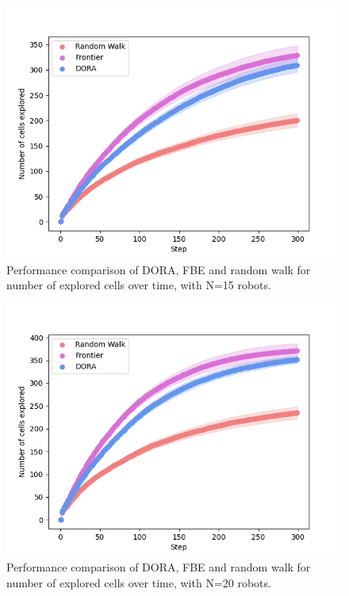 \begin{figure}[h]
	\centering
    \includegraphics[width=0.99\columnwidth]{images/explored_15.png}
    \caption{Performance comparison of DORA, FBE and random walk for number of explored cells over time, with N=15 robots.}
    \label{results:explored15}
\end{figure}

\begin{figure}[h]
	\centering
    \includegraphics[width=0.99\columnwidth]{images/explored_20.png}
    \caption{Performance comparison of DORA, FBE and random walk for number of explored cells over time, with N=20 robots.}
    \label{results:explored20}
\end{figure}

